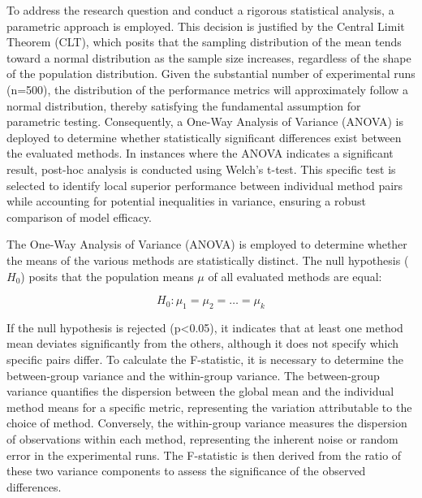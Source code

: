 To address the research question and conduct a rigorous statistical analysis, a parametric approach is employed. 
This decision is justified by the Central Limit Theorem (CLT), which posits that the sampling distribution of the mean tends toward a normal distribution as the sample size increases, regardless of the shape of the population distribution. 
Given the substantial number of experimental runs (n=500), the distribution of the performance metrics will approximately follow a normal distribution, thereby satisfying the fundamental assumption for parametric testing. 
Consequently, a One-Way Analysis of Variance (ANOVA) is deployed to determine whether statistically significant differences exist between the evaluated methods. 
In instances where the ANOVA indicates a significant result, post-hoc analysis is conducted using Welch's t-test. 
This specific test is selected to identify local superior performance between individual method pairs while accounting for potential inequalities in variance, ensuring a robust comparison of model efficacy.


The One-Way Analysis of Variance (ANOVA) is employed to determine whether the means of the various methods are statistically distinct. 
The null hypothesis ($H_0$) posits that the population means $\mu$ of all evaluated methods are equal:

\begin{equation}
H_0: \mu_1 = \mu_2 = \dots = \mu_k
\end{equation}

If the null hypothesis is rejected (p<0.05), it indicates that at least one method mean deviates significantly from the others, although it does not specify which specific pairs differ. 
To calculate the F-statistic, it is necessary to determine the between-group variance and the within-group variance. 
The between-group variance quantifies the dispersion between the global mean and the individual method means for a specific metric, representing the variation attributable to the choice of method. 
Conversely, the within-group variance measures the dispersion of observations within each method, representing the inherent noise or random error in the experimental runs. 
The F-statistic is then derived from the ratio of these two variance components to assess the significance of the observed differences.



